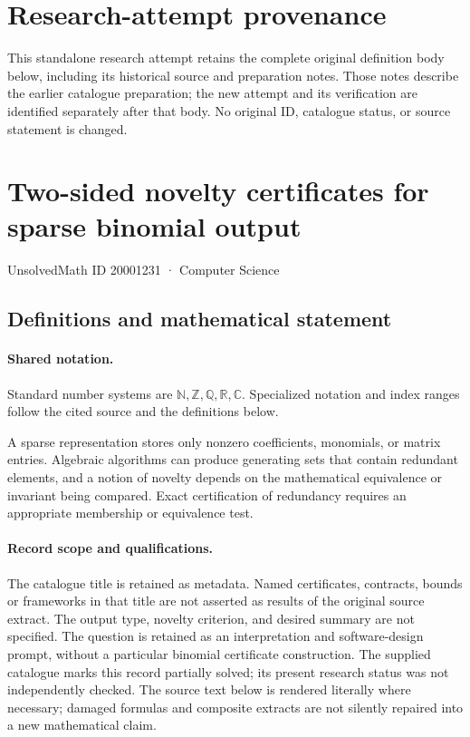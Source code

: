 \documentclass[11pt]{article}
\begin{document}
\section*{Research-attempt provenance}
This standalone research attempt retains the complete original definition body below,
including its historical source and preparation notes. Those notes describe the
earlier catalogue preparation; the new attempt and its verification are identified
separately after that body. No original ID, catalogue status, or source statement is changed.

\section{Two-sided novelty certificates for sparse binomial output}\label{20001231}
{\small UnsolvedMath ID 20001231 · Computer Science}
\subsection{Definitions and mathematical statement}

\paragraph{Shared notation.}Standard number systems are $\mathbb N,\mathbb Z,\mathbb Q,\mathbb R,\mathbb C$. Specialized notation and index ranges follow the cited source and the definitions below.


A sparse representation stores only nonzero coefficients, monomials, or matrix entries. Algebraic algorithms can produce generating sets that contain redundant elements, and a notion of novelty depends on the mathematical equivalence or invariant being compared. Exact certification of redundancy requires an appropriate membership or equivalence test.
\paragraph{Record scope and qualifications.}
The catalogue title is retained as metadata. Named certificates, contracts, bounds or frameworks in that title are not asserted as results of the original source extract.
The output type, novelty criterion, and desired summary are not specified. The question is retained as an interpretation and software-design prompt, without a particular binomial certificate construction. The supplied catalogue marks this record partially solved; its present research status was not independently checked.
The source text below is rendered literally where necessary; damaged formulas and composite extracts are not silently repaired into a new mathematical claim.
\end{document}
